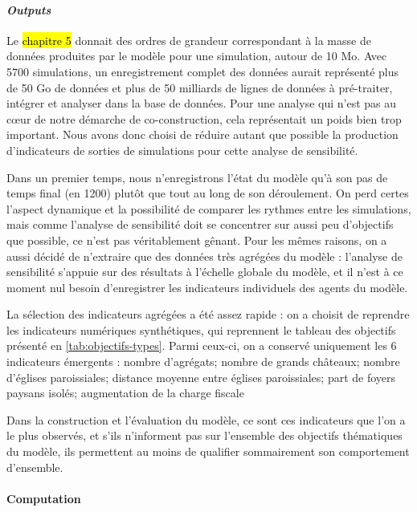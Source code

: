 \paragraph{\textit{Outputs}}

Le \hl{chapitre 5} donnait des ordres de grandeur correspondant à la masse de données produites par le modèle pour une simulation, autour de 10 Mo.
Avec 5700 simulations, un enregistrement complet des données aurait représenté plus de 50 Go de données et plus de 50 milliards de lignes de données à pré-traiter, intégrer et analyser dans la base de données.
Pour une analyse qui n'est pas au cœur de notre démarche de co-construction, cela représentait un poids bien trop important.
Nous avons donc choisi de réduire autant que possible la production d'indicateurs de sorties de simulations pour cette analyse de sensibilité.

Dans un premier temps, nous n'enregistrons l'état du modèle qu'à son pas de temps final (en 1200) plutôt que tout au long de son déroulement.
On perd certes l'aspect dynamique et la possibilité de comparer les rythmes entre les simulations, mais comme l'analyse de sensibilité doit se concentrer sur aussi peu d'objectifs que possible, ce n'est pas véritablement gênant.
Pour les mêmes raisons, on a aussi décidé de n'extraire que des données très agrégées du modèle : l'analyse de sensibilité s'appuie sur des résultats à l'échelle globale du modèle, et il n'est à ce moment nul besoin d'enregistrer les indicateurs individuels des agents du modèle.

La sélection des indicateurs agrégées a été assez rapide : on a choisit de reprendre les indicateurs numériques synthétiques, qui reprennent le tableau des objectifs présenté en \cref{tab:objectifs-types}.
Parmi ceux-ci, on a conservé uniquement les 6 indicateurs \og émergents\fg{} : 
nombre d'agrégats; nombre de grands châteaux; nombre d'églises paroissiales; distance moyenne entre églises paroissiales; part de foyers paysans isolés; augmentation de la charge fiscale
	
Dans la construction et l'évaluation du modèle, ce sont ces indicateurs que l'on a le plus observés, et s'ils n'informent pas sur l'ensemble des objectifs thématiques du modèle, ils permettent au moins de qualifier sommairement son comportement d'ensemble.

\paragraph{Computation}

